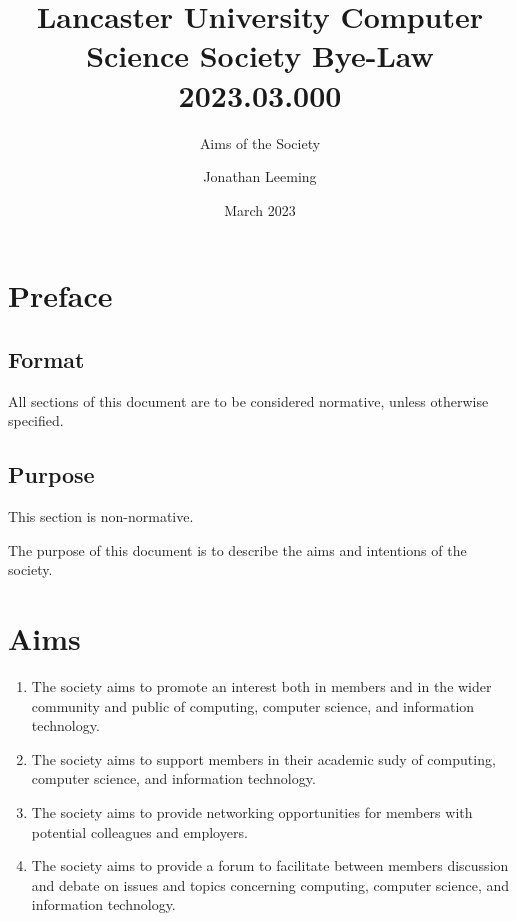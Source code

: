 \documentclass{scrartcl}
\title{Lancaster University Computer Science Society Bye-Law 2023.03.000}
\subtitle{Aims of the Society}
\author{Jonathan Leeming}
\date{March 2023}
\begin{document}
    \maketitle
    
    \clearpage
    \tableofcontents

    \clearpage
    \section{Preface}
        \label{preface}
        \subsection{Format}
            \label{preface--format}
            All sections of this document are to be considered normative, unless otherwise specified.

        \subsection{Purpose}
            \label{preface--purpose}
            This section is non-normative.

            The purpose of this document is to describe the aims and intentions of the society.

    \clearpage
    \section{Aims}
        \label{aims}
        \begin{enumerate}
            \item The society aims to promote an interest both in members and in the wider community and public of computing, computer science, and information technology.
            \item The society aims to support members in their academic sudy of computing, computer science, and information technology.
            \item The society aims to provide networking opportunities for members with potential colleagues and employers.
            \item The society aims to provide a forum to facilitate between members discussion and debate on issues and topics concerning computing, computer science, and information technology.
        \end{enumerate}
\end{document}
